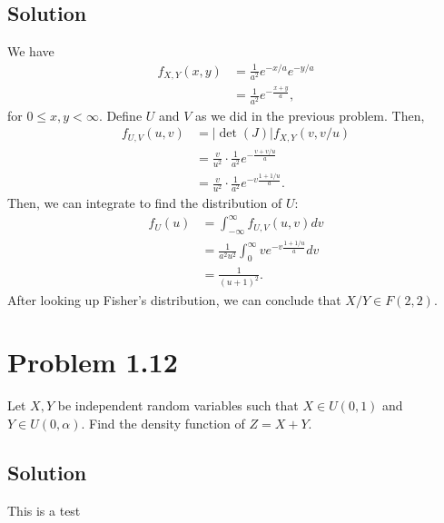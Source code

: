 \documentclass[10pt,a4paper]{article}
\theoremstyle{theorem}
\theoremstyle{definition}
\begin{document}
\subsection*{Solution}
We have
\begin{align*}
f_{X, Y} (x, y) &= \frac{1}{a^2} e^{-x/a} e^{-y/a}\\
&= \frac{1}{a^2} e^{-\frac{x + y}{a}},
\end{align*}
for $0 \leq x, y < \infty$. Define $U$ and $V$ as we did in the previous problem. Then,
\begin{align*}
f_{U, V} (u, v) &= |\det(J)| f_{X, Y} (v, v/u)\\
&= \frac{v}{u^2} \cdot \frac{1}{a^2} e^{-\frac{v + v/u}{a}}\\
&=  \frac{v}{u^2} \cdot \frac{1}{a^2} e^{-v\frac{1 + 1/u}{a}}.
\end{align*}
Then, we can integrate to find the distribution of $U$:
\begin{align*}
f_U(u) &= \int_{- \infty}^\infty f_{U, V} (u, v) dv\\
&= \frac{1}{a^2 u^2} \int_{0}^\infty v e^{-v\frac{1 + 1/u}{a}} dv\\
&= \frac{1}{(u + 1)^2}.
\end{align*}
After looking up Fisher's distribution, we can conclude that $X/Y \in F(2, 2)$.


\section*{Problem 1.12}
Let $X, Y$ be independent random variables such that $X \in U(0, 1)$ and $Y \in U(0, \alpha)$. Find the density function of $Z = X + Y$.

\subsection*{Solution}
This is a test
\end{document}
